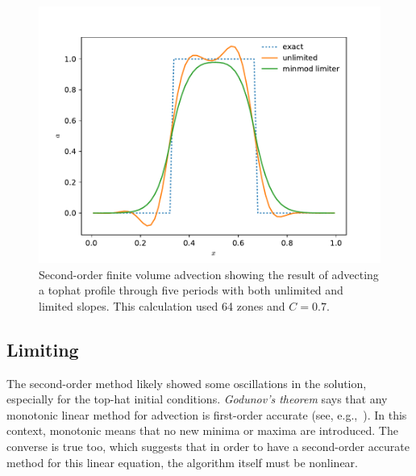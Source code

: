 \begin{figure}
\centering
\includegraphics[width=0.8\linewidth]{fv-advect}
\caption[Second-order finite-volume advection]
{\label{fig:fvadvect} Second-order finite volume advection showing the
result of advecting a tophat profile through five periods with both
unlimited and limited slopes.  This calculation used 64 zones and
$C=0.7$. \\ 
}
\end{figure}

\subsection{Limiting}

The second-order method likely showed some oscillations in the
solution, especially for the top-hat initial conditions.  {\em
  Godunov's theorem} says that any monotonic linear method for
advection is first-order accurate (see, e.g.,~\cite{laney}).  In this
context, monotonic means that no new minima or maxima are introduced.
The converse is true too, which suggests that in order to have a
second-order accurate method for this linear equation, the algorithm
itself must be nonlinear.

